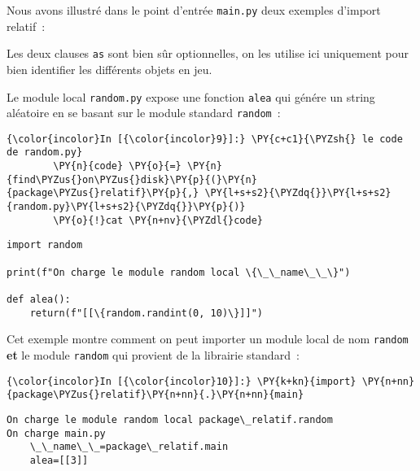     Nous avons illustré dans le point d'entrée \texttt{main.py} deux
exemples d'import relatif~:

    Les deux clauses \texttt{as} sont bien sûr optionnelles, on les utilise
ici uniquement pour bien identifier les différents objets en jeu.

    Le module local \texttt{random.py} expose une fonction \texttt{alea} qui
génére un string aléatoire en se basant sur le module standard
\texttt{random}~:

    \begin{Verbatim}[commandchars=\\\{\},frame=single,framerule=0.3mm,rulecolor=\color{cellframecolor}]
{\color{incolor}In [{\color{incolor}9}]:} \PY{c+c1}{\PYZsh{} le code de random.py}
        \PY{n}{code} \PY{o}{=} \PY{n}{find\PYZus{}on\PYZus{}disk}\PY{p}{(}\PY{n}{package\PYZus{}relatif}\PY{p}{,} \PY{l+s+s2}{\PYZdq{}}\PY{l+s+s2}{random.py}\PY{l+s+s2}{\PYZdq{}}\PY{p}{)}
        \PY{o}{!}cat \PY{n+nv}{\PYZdl{}code}
\end{Verbatim}


    \begin{Verbatim}[commandchars=\\\{\},frame=single,framerule=0.3mm,rulecolor=\color{cellframecolor}]
import random

print(f"On charge le module random local \{\_\_name\_\_\}")

def alea():
    return(f"[[\{random.randint(0, 10)\}]]")
\end{Verbatim}

    Cet exemple montre comment on peut importer un module local de nom
\texttt{random} \textbf{et} le module \texttt{random} qui provient de la
librairie standard~:

    \begin{Verbatim}[commandchars=\\\{\},frame=single,framerule=0.3mm,rulecolor=\color{cellframecolor}]
{\color{incolor}In [{\color{incolor}10}]:} \PY{k+kn}{import} \PY{n+nn}{package\PYZus{}relatif}\PY{n+nn}{.}\PY{n+nn}{main}
\end{Verbatim}


    \begin{Verbatim}[commandchars=\\\{\},frame=single,framerule=0.3mm,rulecolor=\color{cellframecolor}]
On charge le module random local package\_relatif.random
On charge main.py
    \_\_name\_\_=package\_relatif.main
    alea=[[3]]
\end{Verbatim}

